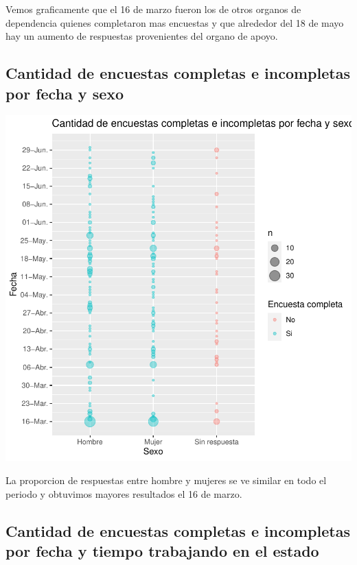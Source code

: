 \documentclass{article}
\begin{document}
Vemos graficamente que el 16 de marzo fueron los de otros organos de dependencia quienes completaron mas encuestas y que alrededor del 18 de mayo hay un aumento de respuestas provenientes del organo de apoyo.

\subsection{Cantidad de encuestas completas e incompletas por fecha y sexo}

\includegraphics{seguimientov3-067}

La proporcion de respuestas entre hombre y mujeres se ve similar en todo el periodo y obtuvimos mayores resultados el 16 de marzo.

\subsection{Cantidad de encuestas completas e incompletas por fecha y tiempo trabajando en el estado}
\end{document}

